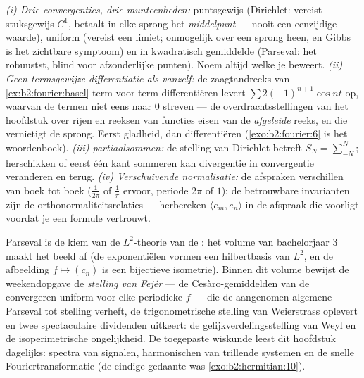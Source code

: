 \begin{remark}
\emph{(i) Drie convergenties, drie munteenheden:} puntsgewijs
(Dirichlet: vereist stuksgewijs $C^1$, betaalt in elke sprong het
\emph{middelpunt} --- nooit een eenzijdige waarde), uniform
(vereist een  limiet; onmogelijk over een sprong heen, en
Gibbs is het zichtbare symptoom) en in kwadratisch gemiddelde
(Parseval: het robuustst, blind voor afzonderlijke punten). Noem
altijd welke je beweert. \emph{(ii) Geen termsgewijze
differentiatie als vanzelf:} de zaagtandreeks van
\cref{ex:b2:fourier:basel} term voor term differentiëren levert
$\sum 2(-1)^{n+1}\cos nt$ op, waarvan de termen niet eens naar $0$
streven --- de overdrachtsstellingen van het hoofdstuk over rijen
en reeksen van functies eisen  van de
\emph{afgeleide} reeks, en die vernietigt de sprong. Eerst
gladheid, dan differentiëren (\cref{exo:b2:fourier:6} is het
woordenboek). \emph{(iii)  partiaalsommen:} de
stelling van Dirichlet betreft $S_N = \sum_{-N}^{N}$; herschikken
of eerst één kant sommeren kan divergentie in convergentie
veranderen en terug. \emph{(iv) Verschuivende normalisatie:} de
afspraken verschillen van boek tot boek ($\frac{1}{2\pi}$ of
$\frac1\pi$ ervoor, periode $2\pi$ of $1$); de betrouwbare
invarianten zijn de orthonormaliteitsrelaties --- herbereken
$\langle e_m, e_n\rangle$ in de afspraak die voorligt voordat je
een formule vertrouwt.
\end{remark}

\begin{remark}
Parseval is de kiem van de $L^2$-theorie van de :
het volume van bachelorjaar 3 maakt het beeld af (de exponentiëlen
vormen een hilbertbasis van $L^2$, en de afbeelding $f \mapsto
(c_n)$ is een bijectieve isometrie). Binnen dit volume bewijst de
weekendopgave de \emph{stelling van Fejér} --- de
Cesàro-gemiddelden van de  convergeren uniform voor
elke  periodieke $f$ --- die de aangenomen algemene
Parseval tot stelling verheft, de trigonometrische stelling van
Weierstrass oplevert en twee spectaculaire dividenden uitkeert: de
gelijkverdelingsstelling van Weyl en de isoperimetrische
ongelijkheid. De toegepaste wiskunde leest dit hoofdstuk dagelijks:
spectra van signalen, harmonischen van trillende systemen en de
snelle Fouriertransformatie (de eindige gedaante was
\cref{exo:b2:hermitian:10}).
\end{remark}

